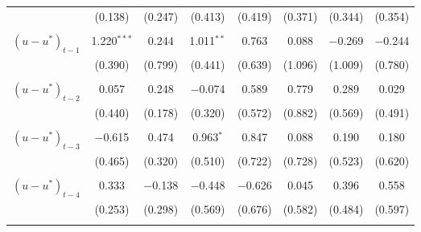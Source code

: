 \documentclass[11pt]{article}
\begin{document}
\begin{table}[!htbp]
\begin{threeparttable}
\begin{tabular}{@{\extracolsep{3pt}}lccccccc}
    & (0.138) & (0.247) & (0.413) & (0.419) & (0.371) & (0.344) & (0.354) \\ 
    & & & & & & & \\ 
   $\left(u-u^*\right)_{t-1}$ & 1.220$^{***}$ & 0.244 & 1.011$^{**}$ & 0.763 & 0.088 & $-$0.269 & $-$0.244 \\ 
   & (0.390) & (0.799) & (0.441) & (0.639) & (1.096) & (1.009) & (0.780) \\ 
   & & & & & & & \\ 
    $\left(u-u^*\right)_{t-2}$ & 0.057 & 0.248 & $-$0.074 & 0.589 & 0.779 & 0.289 & 0.029 \\ 
    & (0.440) & (0.178) & (0.320) & (0.572) & (0.882) & (0.569) & (0.491) \\ 
    & & & & & & & \\ 
    $\left(u-u^*\right)_{t-3}$ & $-$0.615 & 0.474 & 0.963$^{*}$ & 0.847 & 0.088 & 0.190 & 0.180 \\ 
    & (0.465) & (0.320) & (0.510) & (0.722) & (0.728) & (0.523) & (0.620) \\ 
    & & & & & & & \\ 
    $\left(u-u^*\right)_{t-4}$  & 0.333 & $-$0.138 & $-$0.448 & $-$0.626 & 0.045 & 0.396 & 0.558 \\ 
    & (0.253) & (0.298) & (0.569) & (0.676) & (0.582) & (0.484) & (0.597) \\ 
    & & & & & & & \\ 
  

\end{tabular}
\end{threeparttable}
\end{table}
\end{document}
